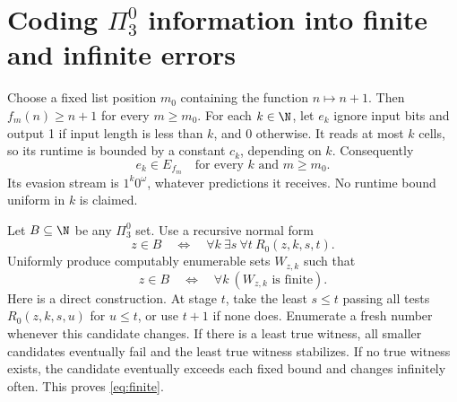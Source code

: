 \documentclass[11pt]{article}
\begin{document}
\section{Coding \texorpdfstring{$\Pi^0_3$}{Pi-0-3} information into finite and infinite errors}

Choose a fixed list position $m_0$ containing the function $n\mapsto n+1$.
Then $f_m(n)\ge n+1$ for every $m\ge m_0$. For each $k\in\N$, let
$e_k$ ignore input bits and output 1 if input length is less than $k$,
and 0 otherwise. It reads at most $k$ cells, so its runtime is bounded
by a constant $c_k$, depending on $k$. Consequently
\begin{equation}\label{eq:codeevader}
 e_k\in E_{f_m}\quad\text{for every }k\text{ and }m\ge m_0.
\end{equation}
Its evasion stream is $1^k0^\omega$, whatever predictions it receives.
No runtime bound uniform in $k$ is claimed.

Let $B\subseteq\N$ be any $\Pi^0_3$ set. Use a recursive normal form
\[
 z\in B\quad\Longleftrightarrow\quad
 \forall k\ \exists s\ \forall t\ R_0(z,k,s,t).
\]
Uniformly produce computably enumerable sets $W_{z,k}$ such that
\begin{equation}\label{eq:finite}
 z\in B\quad\Longleftrightarrow\quad
 \forall k\ (W_{z,k}\text{ is finite}).
\end{equation}
Here is a direct construction. At stage $t$, take the least $s\le t$
passing all tests $R_0(z,k,s,u)$ for $u\le t$, or use $t+1$ if none
does. Enumerate a fresh number whenever this candidate changes. If
there is a least true witness, all smaller candidates eventually fail
and the least true witness stabilizes. If no true witness exists,
the candidate eventually exceeds each fixed bound and changes
infinitely often. This proves \eqref{eq:finite}.
\end{document}
